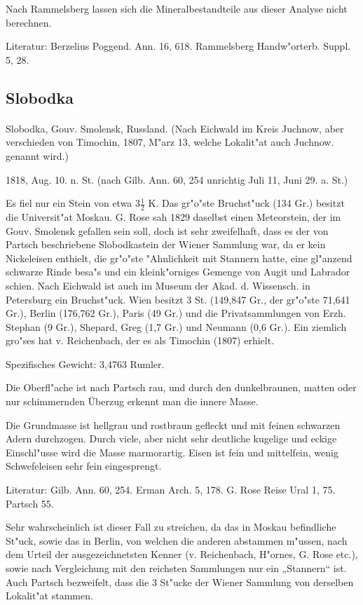 \documentclass[a4paper, 11pt, oneside]{article}
\begin{document}
Nach Rammelsberg lassen sich die Mineralbestandteile aus dieser Analyse nicht berechnen.

Literatur: Berzelius Poggend. Ann. 16, 618. Rammelsberg Handw"orterb. Suppl. 5, 28.

\subsection{Slobodka}
\normalsize
\paragraph{}
Slobodka, Gouv. Smolensk, Russland. (Nach Eichwald im Kreis Juchnow, aber verschieden von Timochin, 1807, M"arz 13, welche Lokalit"at auch Juchnow. genannt wird.)

1818, Aug. 10. n. St. (nach Gilb. Ann. 60, 254 unrichtig Juli 11, Juni 29. a. St.)

Es fiel nur ein Stein von etwa $3\frac{1}{2}$ K. Das gr"o"ste Bruchst"uck (134 Gr.) besitzt die Universit"at Moskau. G. Rose sah 1829 daselbst einen Meteorstein, der im Gouv. Smolensk gefallen sein soll, doch ist sehr zweifelhaft, dass es der von Partsch beschriebene Slobodkastein der Wiener Sammlung war, da er kein Nickeleisen enthielt, die gr"o"ste "Ahnlichkeit mit Stannern hatte, eine gl"anzend schwarze Rinde besa"s und ein kleink"orniges Gemenge von Augit und Labrador schien. Nach Eichwald ist auch im Museum der Akad. d. Wissensch. in Petersburg ein Bruchst"uck. Wien besitzt 3 St. (149,847 Gr., der gr"o"ste 71,641 Gr.), Berlin (176,762 Gr.), Paris (49 Gr.) und die Privatsammlungen von Erzh. Stephan (9 Gr.), Shepard, Greg (1,7 Gr.) und Neumann (0,6 Gr.). Ein ziemlich gro"ses hat v. Reichenbach, der es als Timochin (1807) erhielt.

Spezifisches Gewicht: 3,4763 Rumler.

Die Oberfl"ache ist nach Partsch rau, und durch den dunkelbraunen, matten oder nur schimmernden Überzug erkennt man die innere Masse.

Die Grundmasse ist hellgrau und rostbraun gefleckt und mit feinen schwarzen Adern durchzogen. Durch viele, aber nicht sehr deutliche kugelige und eckige Einschl"usse wird die Masse marmorartig. Eisen ist fein und mittelfein, wenig Schwefeleisen sehr fein eingesprengt.

Literatur: Gilb. Ann. 60, 254. Erman Arch. 5, 178. G. Rose Reise Ural 1, 75. Partsch 55.

Sehr wahrscheinlich ist dieser Fall zu streichen, da das in Moskau befindliche St"uck, sowie das in Berlin, von welchen die anderen abstammen m"ussen, nach dem Urteil der ausgezeichnetsten Kenner (v. Reichenbach, H"ornes, G. Rose etc.), sowie nach Vergleichung mit den reichsten Sammlungen nur ein „Stannern“ ist. Auch Partsch bezweifelt, dass die 3 St"ucke der Wiener Sammlung von derselben Lokalit"at stammen.
\end{document}
